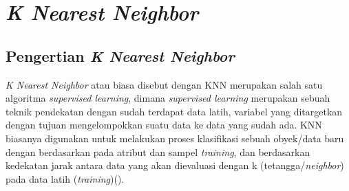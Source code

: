 \section{\textit{K Nearest Neighbor}}
\subsection{Pengertian \textit{K Nearest Neighbor}}
\textit{K Nearest Neighbor} atau biasa disebut dengan KNN merupakan salah satu algoritma \textit{supervised learning}, dimana \textit{supervised learning} merupakan sebuah teknik pendekatan dengan sudah terdapat data latih, variabel yang ditargetkan dengan tujuan mengelompokkan suatu data ke data yang sudah ada. KNN biasanya digunakan untuk melakukan proses klasifikasi sebuah obyek/data baru dengan berdasarkan pada atribut dan sampel \textit{training}, dan berdasarkan kedekatan jarak antara data yang akan dievaluasi dengan k (tetangga/\textit{neighbor}) pada data latih (\textit{training})(\cite{hermaduanti2008sistem}).

